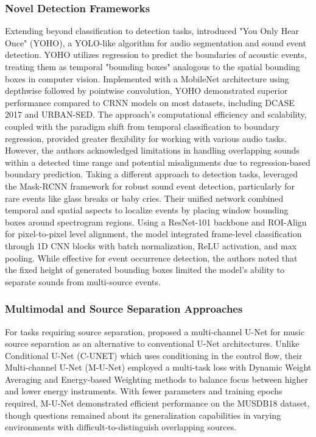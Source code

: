 \documentclass[11pt]{article}
\begin{document}
\subsubsection{Novel Detection Frameworks}
Extending beyond classification to detection tasks, \citep{Venkatesh_2022} introduced "You Only Hear Once" (YOHO), a YOLO-like algorithm for audio segmentation and sound event detection. YOHO utilizes regression to predict the boundaries of acoustic events, treating them as temporal "bounding boxes" analogous to the spatial bounding boxes in computer vision. Implemented with a MobileNet architecture using depthwise followed by pointwise convolution, YOHO demonstrated superior performance compared to CRNN models on most datasets, including DCASE 2017 and URBAN-SED. The approach's computational efficiency and scalability, coupled with the paradigm shift from temporal classification to boundary regression, provided greater flexibility for working with various audio tasks. However, the authors acknowledged limitations in handling overlapping sounds within a detected time range and potential misalignments due to regression-based boundary prediction.
Taking a different approach to detection tasks, \citep{8995448} leveraged the Mask-RCNN framework for robust sound event detection, particularly for rare events like glass breaks or baby cries. Their unified network combined temporal and spatial aspects to localize events by placing window bounding boxes around spectrogram regions. Using a ResNet-101 backbone and ROI-Align for pixel-to-pixel level alignment, the model integrated frame-level classification through 1D CNN blocks with batch normalization, ReLU activation, and max pooling. While effective for event occurrence detection, the authors noted that the fixed height of generated bounding boxes limited the model's ability to separate sounds from multi-source events.

\subsubsection{Multimodal and Source Separation Approaches}
For tasks requiring source separation, \citep{kadandale2020multichannelunetmusicsource} proposed a multi-channel U-Net for music source separation as an alternative to conventional U-Net architectures. Unlike Conditional U-Net (C-UNET) which uses conditioning in the control flow, their Multi-channel U-Net (M-U-Net) employed a multi-task loss with Dynamic Weight Averaging and Energy-based Weighting methods to balance focus between higher and lower energy instruments. With fewer parameters and training epochs required, M-U-Net demonstrated efficient performance on the MUSDB18 dataset, though questions remained about its generalization capabilities in varying environments with difficult-to-distinguish overlapping sources.
\end{document}
